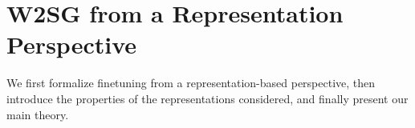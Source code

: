 


\section{W2SG from a Representation Perspective}


{We first formalize finetuning from a representation-based perspective, then introduce the properties of the representations considered, and finally present our main theory.}













